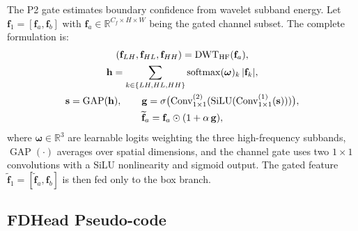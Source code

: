 \documentclass{article}
\theoremstyle{plain}
\theoremstyle{definition}
\theoremstyle{remark}
\begin{document}
The P2 gate estimates boundary confidence from wavelet subband energy. Let $\mathbf{f}_1=[\mathbf{f}_a,\mathbf{f}_b]$ with $\mathbf{f}_a\in\mathbb{R}^{C_f\times H\times W}$ being the gated channel subset. The complete formulation is:
\vspace{-0.2cm}
\begin{equation}
\label{eq:hfgate_appendix}
\begin{gathered}
(\mathbf{f}_{LH},\mathbf{f}_{HL},\mathbf{f}_{HH}) = \mathrm{DWT}_{\mathrm{HF}}(\mathbf{f}_a),\\
\mathbf{h} = \sum_{k\in\{LH,HL,HH\}} \operatorname{softmax}(\boldsymbol{\omega})_k\,|\mathbf{f}_k|,\\
\mathbf{s} = \operatorname{GAP}(\mathbf{h}),\qquad \mathbf{g} = \sigma\bigl(\mathrm{Conv}_{1\times 1}^{(2)}(\mathrm{SiLU}(\mathrm{Conv}_{1\times 1}^{(1)}(\mathbf{s})))\bigr),\\
\widetilde{\mathbf{f}}_a = \mathbf{f}_a\odot(1+\alpha\,\mathbf{g}),
\end{gathered}
\vspace{-0.2cm}
\end{equation}
where $\boldsymbol{\omega}\in\mathbb{R}^{3}$ are learnable logits weighting the three high-frequency subbands, $\operatorname{GAP}(\cdot)$ averages over spatial dimensions, and the channel gate uses two $1\times 1$ convolutions with a SiLU nonlinearity and sigmoid output. The gated feature $\widetilde{\mathbf{f}}_1=[\widetilde{\mathbf{f}}_a,\mathbf{f}_b]$ is then fed only to the box branch.

\subsection{FDHead Pseudo-code}
\end{document}
